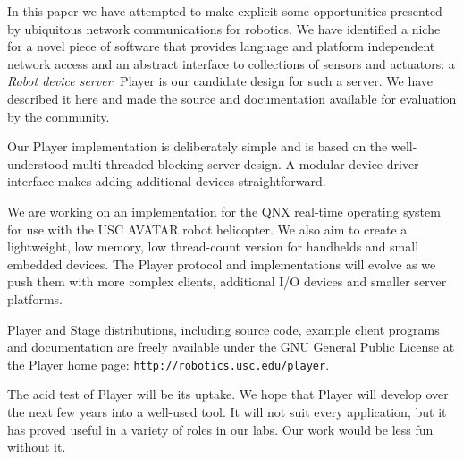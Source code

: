 In this paper we have attempted to make explicit some opportunities
presented by ubiquitous network communications for robotics. We have
identified a niche for a novel piece of software that provides
language and platform independent network access and an abstract
interface to collections of sensors and actuators: a {\em Robot device
  server}. Player is our candidate design for such a server.  We have
described it here and made the source and documentation available for
evaluation by the community.

Our Player implementation is deliberately simple and is based on the
well-understood multi-threaded blocking server design. A modular
device driver interface makes adding additional devices straightforward.

We are working on an implementation for the QNX real-time operating
system for use with the USC AVATAR robot helicopter. We also aim to
create a lightweight, low memory, low thread-count version for
handhelds and small embedded devices. The Player protocol and
implementations will evolve as we push them with more complex clients,
additional I/O devices and smaller server platforms.

\label{section:obtain}
Player and Stage distributions, including source code, example 
client programs
and documentation are freely available under the GNU 
General Public License at the
Player home page: \verb+http://robotics.usc.edu/player+.

The acid test of Player will be its uptake. We hope that Player will
develop over the next few years into a well-used tool. It will not
suit every application, but it has proved useful in a variety of roles
in our labs. Our work would be less fun without it.

